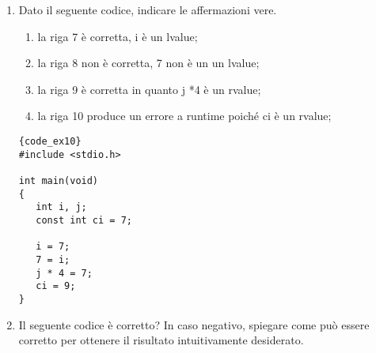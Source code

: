\begin{enumerate}
\vspace{1cm}
\item {} Dato il seguente codice, indicare le affermazioni vere.
     \begin{enumerate} 
        \item la riga 7 è corretta, i è un lvalue;
        \item la riga 8 non è corretta, 7 non è un un lvalue;
        \item la riga 9 è corretta in quanto j *4 è un rvalue;
        \item la riga 10 produce un errore a runtime poiché ci è un rvalue;
     \end{enumerate} 
\begin{minipage}{.40\textwidth}
\begin{lstlisting}{code_ex10}
#include <stdio.h>

int main(void)
{ 
   int i, j; 
   const int ci = 7;

   i = 7;
   7 = i; 
   j * 4 = 7; 
   ci = 9;
} 
\end{lstlisting}
\end{minipage}\hfill
\begin{minipage}[t]{.50\textwidth}
\end{minipage}


\clearpage
\item {} Il seguente codice è corretto? In caso negativo, spiegare come può essere corretto per ottenere il risultato intuitivamente desiderato.


\end{enumerate}
